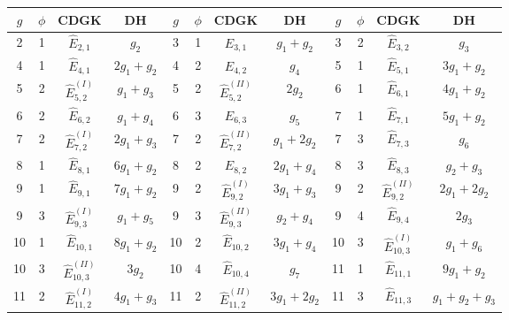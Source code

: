 \documentclass[a4paper,11pt]{article}
\begin{document}
\begin{table}
\begin{center}
{\scriptsize
\begin{tabular}{|cccc|cccc|cccc|}
\hline
$g$  &  $\phi$  &   CDGK   &   DH     &    $g$  &  $\phi$  &  CDGK  &  DH   &    $g$  &   $\phi$  &  CDGK  &  DH\\
\hline
2  &  1  &  $\widehat{E}_{2,1}$  &  $g_{2}$    &    3  &  1  &  $\widehat{E}_{3,1}$  &  $g_{1}+g_{2}$    &    3  &  2  &  $\widehat{E}_{3,2}$  &  $g_{3}$\\
4  &  1  &  $\widehat{E}_{4,1}$  &  $2g_{1}+g_{2}$    &    4  &  2  &  $\widehat{E}_{4,2}$  &  $g_{4}$    &    5  &  1  &  $\widehat{E}_{5,1}$  &  $3g_{1}+g_{2}$\\
5  &  2  &  $\widehat{E}_{5,2}^{(I)}$  &  $g_{1}+g_{3}$    &    5  &  2  &  $\widehat{E}_{5,2}^{(II)}$  &  $2g_{2}$    &    6  &  1  &  $\widehat{E}_{6,1}$  &  $4g_{1}+g_{2}$\\
6  &  2  &  $\widehat{E}_{6,2}$  &  $g_{1}+g_{4}$    &    6  &  3  &  $\widehat{E}_{6,3}$  &  $g_{5}$    &    7  &  1  &  $\widehat{E}_{7,1}$  &  $5g_{1}+g_{2}$\\
7  &  2  &  $\widehat{E}_{7,2}^{(I)}$  &  $2g_{1}+g_{3}$    &    7  &  2  &  $\widehat{E}_{7,2}^{(II)}$  &  $g_{1}+2g_{2}$    &    7  &  3  &  $\widehat{E}_{7,3}$  &  $g_{6}$\\
8  &  1  &  $\widehat{E}_{8,1}$  &  $6g_{1}+g_{2}$    &    8  &  2  &  $\widehat{E}_{8,2}$  &  $2g_{1}+g_{4}$    &    8  &  3  &  $\widehat{E}_{8,3}$  &  $g_{2}+g_{3}$\\
9  &  1  &  $\widehat{E}_{9,1}$  &  $7g_{1}+g_{2}$    &    9  &  2  &  $\widehat{E}_{9,2}^{(I)}$  &  $3g_{1}+g_{3}$    &    9  &  2  &  $\widehat{E}_{9,2}^{(II)}$  &  $2g_{1}+2g_{2}$\\
9  &  3  &  $\widehat{E}_{9,3}^{(I)}$  &  $g_{1}+g_{5}$    &    9  &  3  &  $\widehat{E}_{9,3}^{(II)}$  &  $g_{2}+g_{4}$    &    9  &  4  &  $\widehat{E}_{9,4}$  &  $2g_{3}$\\
10  &  1  &  $\widehat{E}_{10,1}$  &  $8g_{1}+g_{2}$    &    10  &  2  &  $\widehat{E}_{10,2}$  &  $3g_{1}+g_{4}$    &    10  &  3  &  $\widehat{E}_{10,3}^{(I)}$  &  $g_{1}+g_{6}$\\
10  &  3  &  $\widehat{E}_{10,3}^{(II)}$  &  $3g_{2}$    &    10  &  4  &  $\widehat{E}_{10,4}$  &  $g_{7}$    &    11  &  1  &  $\widehat{E}_{11,1}$  &  $9g_{1}+g_{2}$\\
11  &  2  &  $\widehat{E}_{11,2}^{(I)}$  &  $4g_{1}+g_{3}$    &    11  &  2  &  $\widehat{E}_{11,2}^{(II)}$  &  $3g_{1}+2g_{2}$    &    11  &  3  &  $\widehat{E}_{11,3}$  &  $g_{1}+g_{2}+g_{3}$\\

\end{tabular}}
\end{center}
\end{table}
\end{document}
